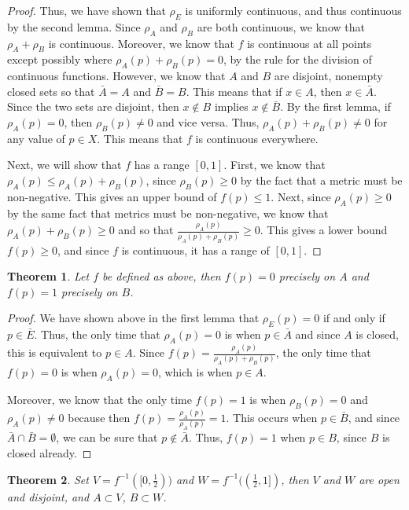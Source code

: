 \documentclass[psamsfonts]{amsart}
\newtheorem{thm}{Theorem}[section]
\theoremstyle{definition}
\theoremstyle{remark}
\numberwithin{equation}{section}
\begin{document}
\begin{proof}
Thus, we have shown that $\rho_E$ is uniformly continuous, and thus continuous by the second lemma. Since $\rho_A$ and $\rho_B$ are both continuous, we know that $\rho_A + \rho_B$ is continuous. Moreover, we know that $f$ is continuous at all points except possibly where $\rho_A(p) + \rho_B(p) = 0$, by the rule for the division of continuous functions. However, we know that $A$ and $B$ are disjoint, nonempty closed sets so that $\bar{A} = A$ and $\bar{B} = B$. This means that if $x \in A$, then $x \in \bar{A}$. Since the two sets are disjoint, then $x \notin B$ implies $x \notin \bar{B}$. By the first lemma, if $\rho_A(p) = 0$, then $\rho_B(p) \neq 0$ and vice versa. Thus, $\rho_A(p) + \rho_B(p) \neq 0$ for any value of $p \in X$. This means that $f$ is continuous everywhere. 

Next, we will show that $f$ has a range $[0,1]$. First, we know that $\rho_A(p) \leq \rho_A(p) + \rho_B(p)$, since $\rho_B(p) \geq 0$ by the fact that a metric must be non-negative. This gives an upper bound of $f(p) \leq 1$. Next, since $\rho_A(p) \geq 0$ by the same fact that metrics must be non-negative, we know that $\rho_A(p) + \rho_B(p) \geq 0$ and so that $\frac{\rho_A(p)}{\rho_A(p) + \rho_B(p)} \geq 0$. This gives a lower bound $f(p) \geq 0$, and since $f$ is continuous, it has a range of $[0,1]$. 
\end{proof}

\begin{thm}
Let $f$ be defined as above, then $f(p) = 0$ precisely on $A$ and $f(p) = 1$ precisely on $B$. 
\end{thm}

\begin{proof}
We have shown above in the first lemma that $\rho_E(p) = 0$ if and only if $p \in \bar{E}$. Thus, the only time that $\rho_A(p) = 0$ is when $p \in \bar{A}$ and since $A$ is closed, this is equivalent to $p \in A$. Since $f(p) = \frac{\rho_A(p)}{\rho_A(p) + \rho_B(p)}$, the only time that $f(p) = 0$ is when $\rho_A(p) = 0$, which is when $p \in A$. 

Moreover, we know that the only time $f(p) = 1$ is when $\rho_B(p) = 0$ and $\rho_A(p) \neq 0$ because then $f(p) = \frac{\rho_A(p)}{\rho_A(p)} = 1$. This occurs when $p \in \bar{B}$, and since $\bar{A} \cap \bar{B} = \emptyset$, we can be sure that $p \notin \bar{A}$. Thus, $f(p) = 1$ when $p \in B$, since $B$ is closed already.  
\end{proof}

\begin{thm}
Set $V = f^{-1}([0,\frac{1}{2}))$ and $W = f^{-1}((\frac{1}{2},1])$, then $V$ and $W$ are open and disjoint, and $A \subset V$, $B \subset W$. 
\end{thm}
\end{document}

